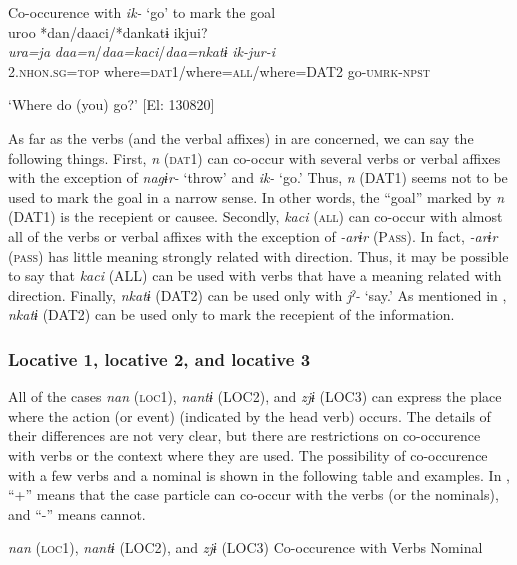 \begin{table}
\ex Co-occurence with \textit{ik-} ‘go’ to mark the goal\\

{\TM}
\glll uroo  *dan/daaci/*dankatɨ  ikjui?\\
\textit{ura=ja}  \textit{daa=n}/\textit{daa=kaci}/\textit{daa=nkatɨ}  \textit{ik-jur-i}\\

    2.\textsc{nhon}.\textsc{sg}=\textsc{top}  where=\textsc{dat}1/where=\textsc{all}/where=DAT2  go-\textsc{umrk}-\textsc{npst}

 \glt    ‘Where do (you) go?’ [El: 130820]

As far as the verbs (and the verbal affixes) in  are concerned, we can say the following things. First, \textit{n} (\textsc{dat}1) can co-occur with several verbs or verbal affixes with the exception of \textit{nagɨr-} ‘throw’ and \textit{ik-} ‘go.’ Thus, \textit{n} (DAT1) seems not to be used to mark the goal in a narrow sense. In other words, the “goal” marked by \textit{n} (DAT1) is the recepient or causee. Secondly, \textit{kaci} (\textsc{all}) can co-occur with almost all of the verbs or verbal affixes with the exception of \textit{-arɨr} (P\textsc{ass}). In fact, \textit{-arɨr} (\textsc{pass}) has little meaning strongly related with direction. Thus, it may be possible to say that \textit{kaci} (ALL) can be used with verbs that have a meaning related with direction. Finally, \textit{nkatɨ} (DAT2) can be used only with \textit{jˀ-} ‘say.’ As mentioned in , \textit{nkatɨ} (DAT2) can be used only to mark the recepient of the information.

\subsubsection{Locative 1, locative 2, and locative 3}

All of the cases \textit{nan} (\textsc{loc}1), \textit{nantɨ} (LOC2), and \textit{zjɨ} (LOC3) can express the place where the action (or event) (indicated by the head verb) occurs. The details of their differences are not very clear, but there are restrictions on co-occurence with verbs or the context where they are used. The possibility of co-occurence with a few verbs and a nominal is shown in the following table and examples. In , “+” means that the case particle can co-occur with the verbs (or the nominals), and “-” means cannot.

\begin{table}
\caption{\label{tab:key:43}.} \textmd{\textit{nan}}\textmd{ (\textsc{loc}1),} \textmd{\textit{nantɨ}}\textmd{ (LOC2), and} \textmd{\textit{zjɨ}}\textmd{ (LOC3)}
Co-occurence with  Verbs        Nominal


\end{table}
\end{table}
